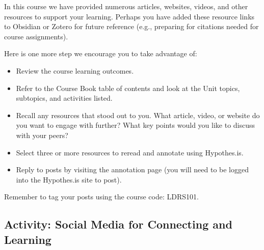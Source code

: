 \documentclass[
  letterpaper,
  DIV=11,
  numbers=noendperiod]{scrreprt}
\providecommand{\tightlist}{%
  \setlength{\itemsep}{0pt}\setlength{\parskip}{0pt}}\usepackage{longtable,booktabs,array}
\begin{document}
\begin{tcolorbox}[enhanced jigsaw, toprule=.15mm, colback=white, colframe=quarto-callout-note-color-frame, bottomtitle=1mm, leftrule=.75mm, coltitle=black, titlerule=0mm, rightrule=.15mm, colbacktitle=quarto-callout-note-color!10!white, left=2mm, title={Learning Activity}, opacitybacktitle=0.6, opacityback=0, breakable, toptitle=1mm, arc=.35mm, bottomrule=.15mm]

In this course we have provided numerous articles, websites, videos, and
other resources to support your learning. Perhaps you have added these
resource links to Obsidian or Zotero for future reference (e.g.,
preparing for citations needed for course assignments).

Here is one more step we encourage you to take advantage of:

\begin{itemize}
\tightlist
\item
  Review the course learning outcomes.
\item
  Refer to the Course Book table of contents and look at the Unit
  topics, subtopics, and activities listed.
\item
  Recall any resources that stood out to you. What article, video, or
  website do you want to engage with further? What key points would you
  like to discuss with your peers?
\item
  Select three or more resources to reread and annotate using
  Hypothes.is.
\item
  Reply to posts by visiting the annotation page (you will need to be
  logged into the Hypothes.is site to post).
\end{itemize}

Remember to tag your posts using the course code: LDRS101.

\end{tcolorbox}

\subsection{Activity: Social Media for Connecting and
Learning}\label{activity-social-media-for-connecting-and-learning}
\end{document}
